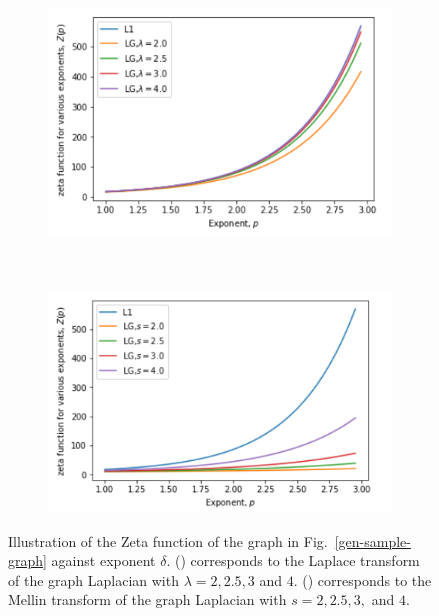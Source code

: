 \documentclass[10pt,a4paper]{article}
\theoremstyle{plain}
\theoremstyle{definition}
\begin{document}
        \begin{figure}[H]
        	\centering
        	\begin{subfigure}[b]{0.35\textwidth}
        		\includegraphics[width= \textwidth]{images/zeta-laplace2.png}
        		\caption{}
        		\label{zeta-laplace}
        	\end{subfigure}~
        	\begin{subfigure}[b]{0.35\textwidth}
        		\includegraphics[width= \textwidth]{images/zeta-mellin2.png}
        		\caption{}
        		\label{zeta-mellin}
        	\end{subfigure} 
        	\caption{Illustration of the Zeta function of the graph in Fig.~\ref{gen-sample-graph} against exponent $\delta$. () corresponds to the Laplace transform of the graph Laplacian with $\lambda = 2,2.5,3 $ and $4$. () corresponds to the Mellin transform of the graph Laplacian with $s = 2, 2.5, 3,$ and $4$. }
        	\label{}
        \end{figure}
    
\end{document}

